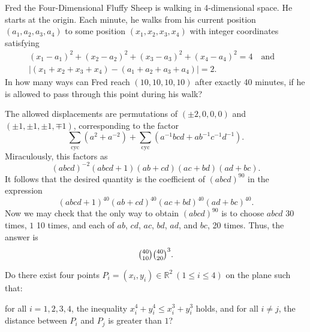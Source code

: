 \begin{question}[name={2019 HMMT, Combinatorics, \href{https://artofproblemsolving.com/community/c129h1786252p11795767}{Problem 10}}]
	Fred the Four-Dimensional Fluffy Sheep is walking in 4-dimensional space. He starts at the origin. Each minute, he walks from his current position $(a_1, a_2, a_3, a_4)$ to some position $(x_1, x_2, x_3, x_4)$ with integer coordinates satisfying
	\begin{multline*}
		(x_1-a_1)^2 + (x_2-a_2)^2 + (x_3-a_3)^2 + (x_4-a_4)^2 = 4 
		\quad \text{and} \quad\\
		|(x_1 + x_2 + x_3 + x_4) - (a_1 + a_2 + a_3 + a_4)| = 2.
	\end{multline*}
	In how many ways can Fred reach $(10, 10, 10, 10)$ after exactly 40 minutes, if he is allowed to pass through this point during his walk?
\end{question}




\begin{solution}[name={Solution by CantonMathGuy}]
	The allowed displacements are permutations of $(\pm 2, 0, 0, 0)$ and $(\pm 1, \pm 1, \pm 1, \mp 1)$, corresponding to the factor
	\[\sum_{\text{cyc}} (a^2 + a^{-2}) + \sum_{\text{cyc}} (a^{-1}bcd + ab^{-1}c^{-1}d^{-1}).\]Miraculously, this factors as
	\[(abcd)^{-2} (abcd + 1)(ab + cd)(ac + bd)(ad + bc).\]It follows that the desired quantity is the coefficient of $(abcd)^{90}$ in the expression
	\[(abcd + 1)^{40} (ab + cd)^{40} (ac + bd)^{40} (ad + bc)^{40}.\]Now we may check that the only way to obtain $(abcd)^{90}$ is to choose $abcd$ 30 times, $1$ 10 times, and each of $ab$, $cd$, $ac$, $bd$, $ad$, and $bc$, 20 times. Thus, the answer is $$\tbinom{40}{10} \tbinom{40}{20}^3.$$
\end{solution}



\begin{question}[name={2019 HMIC, \href{https://artofproblemsolving.com/community/c6h1829628p12247077}{Problem 3}}]
	Do there exist four points $P_i = (x_i, y_i) \in \mathbb{R}^2\ (1\leq i \leq 4)$ on the plane such that:
	\begin{tasks}
		\task for all $i = 1,2,3,4$, the inequality $x_i^4 + y_i^4  \le x_i^3+ y_i^3$ holds, and
		\task for all $i \neq j$, the distance between $P_i$ and $P_j$ is greater than $1$?
	\end{tasks}
\end{question}




